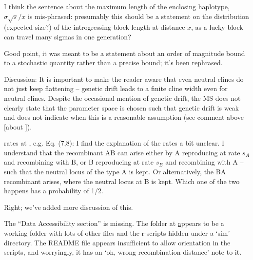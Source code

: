 \reply
{}

\begin{point}{\revref}
 I think the sentence about the maximum length of the enclosing haplotype, $\sigma \sqrt{s} / x$ is mis-phrased: presumably this should be a statement on the distribution (expected size?) of the introgressing block length at distance $x$, as a lucky block can travel many sigmas in one generation?
\end{point}

\reply
Good point, it was meant to be a statement about an order of magnitude bound to a stochastic quantity rather than a precise bound; it's been rephrased.

\begin{point}{Discussion:}
    It is important to make the reader aware that even neutral clines do not just keep flattening -- genetic drift leads to a finite cline width even for neutral clines. Despite the occasional mention of genetic drift, the MS does not clearly state that the parameter space is chosen such that genetic drift is weak and does not indicate when this is a reasonable assumption (see comment above [about ]).
\end{point}

\reply
{}


\begin{point}{rates at \revref, e.g. Eq. (7,8):}
 I find the explanation of the rates a bit unclear. I understand that the recombinant AB can arise either by A reproducing at rate $s_A$ and recombining with B, or B reproducing at rate $s_B$ and recombining with A -- such that the neutral locus of the type A is kept. Or alternatively, the BA recombinant arises, where the neutral locus at B is kept. Which one of the two happens has a probability of 1/2.
\end{point}

\reply
Right; we've added more discussion of this.

\begin{point}{}
The ``Data Accessibility section'' is missing. The folder at \href{http://github.com_petrelharp_clinal-lineages}  appears to be a working folder with lots of other files and the r-scripts hidden under a `sim' directory. The README file appears insufficient to allow orientation in the scripts, and worryingly, it has an `oh, wrong recombination distance' note to it.
\end{point}

